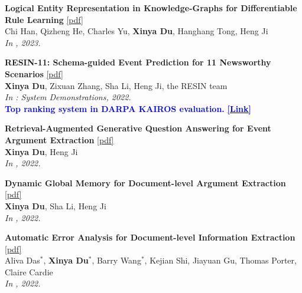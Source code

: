\begin{enumerate}[{[}1{]},resume,leftmargin=*]
{{\bf Logical Entity Representation in Knowledge-Graphs for Differentiable Rule Learning} 
\href{https://openreview.net/pdf?id=JdgO-ht1uTN}{{[pdf]}} \\
Chi Han, Qizheng He, Charles Yu, \textbf{Xinya Du}, Hanghang Tong, Heng Ji\\
{\it In \ICLR, 2023.}\\
}

\parbox{\linewidth}{
\item\label{pub:resin}
{\bf RESIN-11: Schema-guided Event Prediction for 11 Newsworthy Scenarios} 
\href{https://aclanthology.org/2022.naacl-demo.7.pdf}{{[pdf]}} \\
{\bf Xinya Du}, Zixuan Zhang, Sha Li, Heng Ji, the RESIN team \\
{\it In \NAACL: System Demonstrations, 2022.} \\
{\textcolor{blue}{\textbf{Top ranking system in DARPA KAIROS evaluation.}}} 
\href{https://www.darpa.mil/program/knowledge-directed-artificial-intelligence-reasoning-over-schemas}{\textcolor{blue}{\textbf{[Link]}}} \\ 
}

\parbox{\linewidth}{
\item
 
{\bf Retrieval-Augmented Generative Question Answering for Event Argument Extraction} 
\href{https://aclanthology.org/2022.emnlp-main.307.pdf}{{[pdf]}} \\
{\bf Xinya Du}, Heng Ji \\
{\it In \EMNLP, 2022.}\\
}

\parbox{\linewidth}{
\item
{\bf Dynamic Global Memory for Document-level Argument Extraction} 
\href{https://aclanthology.org/2022.acl-long.361.pdf}{{[pdf]}} \\
{\bf Xinya Du}, Sha Li, Heng Ji \\
{\it In \ACL, 2022.}\\
}

\parbox{\linewidth}{
\item
 
{\bf Automatic Error Analysis for Document-level Information Extraction} 
\href{https://aclanthology.org/2022.acl-long.274.pdf}{{[pdf]}} \\
Aliva Das$^{*}$, {\bf Xinya Du}$^{*}$, Barry Wang$^{*}$, Kejian Shi, Jiayuan Gu, Thomas Porter, Claire Cardie \\
{\it In \ACL, 2022.} \\
}


\end{enumerate}
